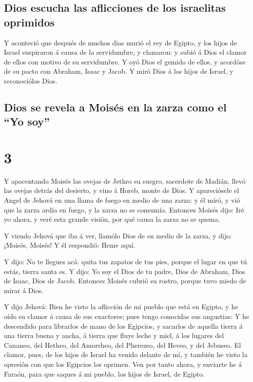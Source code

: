 \hypertarget{dios-escucha-las-aflicciones-de-los-israelitas-oprimidos}{%
\subsection{Dios escucha las aflicciones de los israelitas
oprimidos}\label{dios-escucha-las-aflicciones-de-los-israelitas-oprimidos}}

 Y aconteció que después de muchos días murió el rey de
Egipto, y los hijos de Israel suspiraron á causa de la servidumbre, y
clamaron: y subió á Dios el clamor de ellos con motivo de su
servidumbre.  Y oyó Dios el gemido de ellos, y acordóse
de su pacto con Abraham, Isaac y Jacob.  Y miró Dios á
los hijos de Israel, y reconociólos Dios.

\hypertarget{dios-se-revela-a-moisuxe9s-en-la-zarza-como-el-yo-soy}{%
\subsection{Dios se revela a Moisés en la zarza como el ``Yo
soy''}\label{dios-se-revela-a-moisuxe9s-en-la-zarza-como-el-yo-soy}}

\hypertarget{section-2}{%
\section{3}\label{section-2}}

 Y apacentando Moisés las ovejas de Jethro su suegro,
sacerdote de Madián, llevó las ovejas detrás del desierto, y vino á
Horeb, monte de Dios.  Y apareciósele el Angel de Jehová
en una llama de fuego en medio de una zarza: y él miró, y vió que la
zarza ardía en fuego, y la zarza no se consumía.  Entonces
Moisés dijo: Iré yo ahora, y veré esta grande visión, por qué causa la
zarza no se quema.

 Y viendo Jehová que iba á ver, llamólo Dios de en medio
de la zarza, y dijo: ¡Moisés, Moisés! Y él respondió: Heme aquí.

 Y dijo: No te llegues acá: quita tus zapatos de tus pies,
porque el lugar en que tú estás, tierra santa es.  Y dijo:
Yo soy el Dios de tu padre, Dios de Abraham, Dios de Isaac, Dios de
Jacob. Entonces Moisés cubrió su rostro, porque tuvo miedo de mirar á
Dios.

 Y dijo Jehová: Bien he visto la aflicción de mi pueblo
que está en Egipto, y he oído su clamor á causa de sus exactores; pues
tengo conocidas sus angustias:  Y he descendido para
librarlos de mano de los Egipcios, y sacarlos de aquella tierra á una
tierra buena y ancha, á tierra que fluye leche y miel, á los lugares del
Cananeo, del Hetheo, del Amorrheo, del Pherezeo, del Heveo, y del
Jebuseo.  El clamor, pues, de los hijos de Israel ha
venido delante de mí, y también he visto la opresión con que los
Egipcios los oprimen.  Ven por tanto ahora, y enviarte he
á Faraón, para que saques á mi pueblo, los hijos de Israel, de Egipto.

